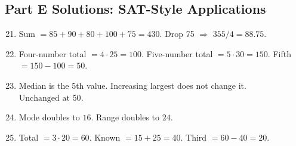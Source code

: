 \documentclass[14pt]{extarticle}
\begin{document}
\subsection*{Part E Solutions: SAT-Style Applications}
\begin{enumerate}
  \setcounter{enumi}{20}
  \item Sum \(=85+90+80+100+75=430\). Drop 75 \(\Rightarrow\) \(355/4=\boxed{88.75}\).
  \item Four-number total \(=4\cdot25=100\). Five-number total \(=5\cdot30=150\). Fifth \(=150-100=\boxed{50}\).
  \item Median is the 5th value. Increasing largest does not change it. \(\boxed{\text{Unchanged at }50}\).
  \item Mode doubles to \(\boxed{16}\). Range doubles to \(\boxed{24}\).
  \item Total \(=3\cdot20=60\). Known \(=15+25=40\). Third \(=60-40=\boxed{20}\).
\end{enumerate}




\end{document}
